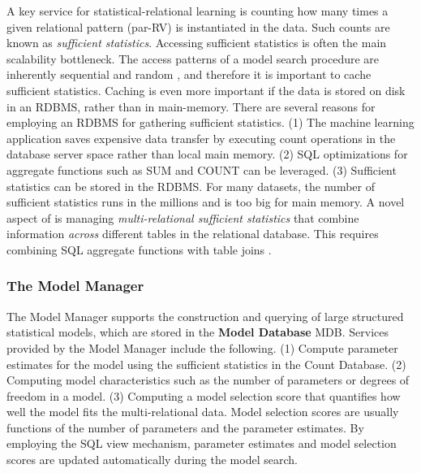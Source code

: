 \documentclass[letterpaper]{article}
\begin{document}
A key service for statistical-relational learning is counting how many times a given relational pattern (par-RV) is instantiated in the data. Such counts are known as {\em sufficient statistics}. 
Accessing sufficient statistics is often the main scalability bottleneck. The access patterns of a model search procedure are inherently sequential and random \cite{Niu2011}, and therefore it is important to cache sufficient statistics.  Caching is even more important if the data is stored on disk in an RDBMS, rather than in main-memory. 
%
There are several reasons for employing an RDBMS for gathering sufficient statistics. 
(1) The machine learning application saves expensive data transfer by executing count operations in the database server space rather than local main memory. (2) SQL optimizations for aggregate functions such as SUM and COUNT can be leveraged. (3) Sufficient statistics can be stored in the RDBMS. For many datasets, the number of sufficient statistics runs in the millions and is too big for main memory.  
%
A novel aspect of \FB is managing {\em multi-relational sufficient statistics} that combine information {\em across} different tables in the relational database. This requires combining SQL aggregate functions with table joins \cite{Qian2014a}. 

 
%
%


\subsubsection{The Model Manager} 

The Model Manager supports the construction and querying of large structured statistical models, which are stored in the \textbf{Model Database} MDB. Services provided by the Model Manager include the following. (1) Compute parameter estimates for the model using the sufficient statistics in the Count Database.  (2) Computing model characteristics such as the number of parameters or degrees of freedom in a model. (3) Computing a model selection score that quantifies how well the model fits the multi-relational data. 
Model selection scores are usually functions of the number of parameters and the parameter estimates.  By employing the SQL view mechanism, parameter estimates and model selection scores are updated automatically during the model search.





 
\end{document}
